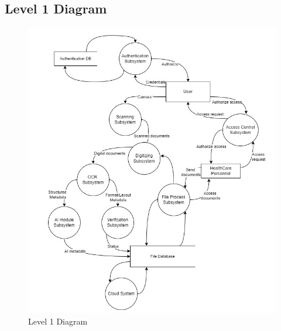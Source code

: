 \subsection{Level 1 Diagram}
\begin{figure}[h]
    \centering
    \includegraphics[width=150mm]{figures/level1.jpg}
    \caption{Level 1 Diagram}
\end{figure}
\newpage